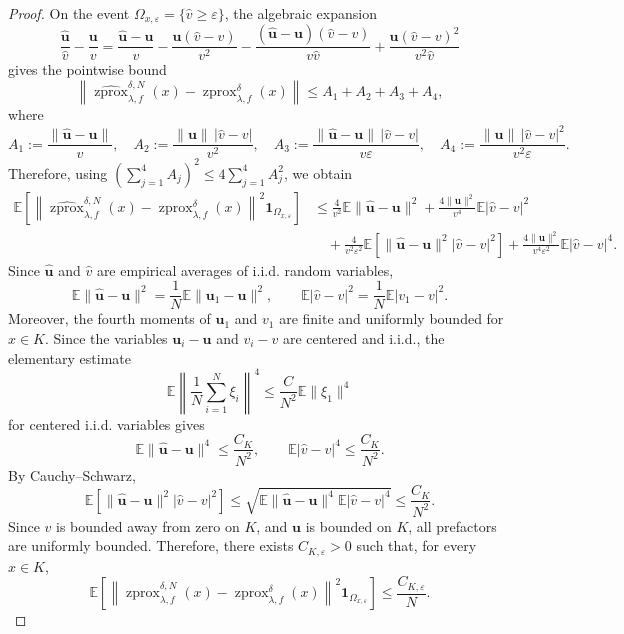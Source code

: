 \documentclass[10pt,a4paper]{amsart}
\newcommand{\szprox}{\ensuremath{\widehat{\operatorname{zprox}}}}
\newcommand{\zprox}{\ensuremath{\operatorname{zprox}}}
\begin{document}
\begin{proof}
On the event \(\Omega_{x,\varepsilon}=\{\hat v\ge \varepsilon\}\), the algebraic expansion
\[
\frac{\hat{\mathbf u}}{\hat v}-\frac{\mathbf u}{v}
=
\frac{\hat{\mathbf u}-\mathbf u}{v}
-
\frac{\mathbf u(\hat v-v)}{v^2}
-
\frac{(\hat{\mathbf u}-\mathbf u)(\hat v-v)}{v\hat v}
+
\frac{\mathbf u(\hat v-v)^2}{v^2\hat v}
\]
gives the pointwise bound
\[
\left\|
\szprox_{\lambda,f}^{\delta,N}(x)
-
\zprox_{\lambda,f}^{\delta}(x)
\right\|
\le A_1+A_2+A_3+A_4,
\]
where
\[
A_1:=\frac{\|\hat{\mathbf u}-\mathbf u\|}{v},
\quad
A_2:=\frac{\|\mathbf u\|\,|\hat v-v|}{v^2}, \quad A_3:=
\frac{\|\hat{\mathbf u}-\mathbf u\|\,|\hat v-v|}{v\varepsilon},
\quad
A_4:=
\frac{\|\mathbf u\|\,|\hat v-v|^2}{v^2\varepsilon}.
\]
Therefore, using \((\sum_{j=1}^4 A_j)^2\le 4\sum_{j=1}^4 A_j^2\), we obtain
\[
\begin{aligned}
\mathbb{E}\left[
\left\|
\szprox_{\lambda,f}^{\delta,N}(x)
-
\zprox_{\lambda,f}^{\delta}(x)
\right\|^2
\mathbf 1_{\Omega_{x,\varepsilon}}
\right] &\le
\frac{4}{v^2}\mathbb{E}\|\hat{\mathbf u}-\mathbf u\|^2
+
\frac{4\|\mathbf u\|^2}{v^4}\mathbb{E}|\hat v-v|^2 \\
&\quad+
\frac{4}{v^2\varepsilon^2}
\mathbb{E}\left[
\|\hat{\mathbf u}-\mathbf u\|^2|\hat v-v|^2
\right]
+
\frac{4\|\mathbf u\|^2}{v^4\varepsilon^2}
\mathbb{E}|\hat v-v|^4 .
\end{aligned}
\]
Since \(\hat{\mathbf u}\) and \(\hat v\) are empirical averages of i.i.d. random variables,
\[
\mathbb{E}\|\hat{\mathbf u}-\mathbf u\|^2
=
\frac{1}{N}\mathbb{E}\|\mathbf u_1-\mathbf u\|^2,
\qquad
\mathbb{E}|\hat v-v|^2
=
\frac{1}{N}\mathbb{E}|v_1-v|^2.
\]
Moreover, the fourth moments of \(\mathbf u_1\) and \(v_1\) are finite and uniformly bounded for \(x\in K\). Since the variables \(\mathbf u_i-\mathbf u\) and \(v_i-v\) are centered and i.i.d., the elementary estimate
\[
\mathbb{E}\left\|\frac1N\sum_{i=1}^N \xi_i\right\|^4
\le
\frac{C}{N^2}\mathbb{E}\|\xi_1\|^4
\]
for centered i.i.d. variables gives
\[
\mathbb{E}\|\hat{\mathbf u}-\mathbf u\|^4
\le
\frac{C_K}{N^2},
\qquad
\mathbb{E}|\hat v-v|^4
\le
\frac{C_K}{N^2}.
\]
By Cauchy--Schwarz,
\[
\mathbb{E}\left[
\|\hat{\mathbf u}-\mathbf u\|^2|\hat v-v|^2
\right]
\le
\sqrt{
\mathbb{E}\|\hat{\mathbf u}-\mathbf u\|^4
\mathbb{E}|\hat v-v|^4
}
\le
\frac{C_K}{N^2}.
\]
Since \(v\) is bounded away from zero on \(K\), and \(\mathbf u\) is bounded on \(K\), all prefactors are uniformly bounded. Therefore, there exists \(C_{K,\varepsilon}>0\) such that, for every \(x\in K\),
\[
\mathbb{E}\left[
\left\|
\szprox_{\lambda,f}^{\delta,N}(x)
-
\zprox_{\lambda,f}^{\delta}(x)
\right\|^2
\mathbf 1_{\Omega_{x,\varepsilon}}
\right]
\le
\frac{C_{K,\varepsilon}}{N}.
\]
\end{proof}
\end{document}
